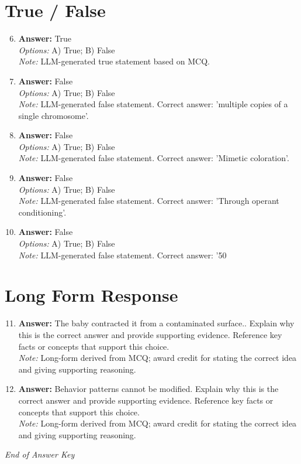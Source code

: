 \documentclass[12pt]{article}
\begin{document}
\section*{True / False}
\begin{enumerate}[label=\arabic*.]
\setcounter{enumi}{5}
\item \textbf{Answer:} True
\\ \textit{Options:} A) True; B) False
\\ \textit{Note:} LLM-generated true statement based on MCQ.
\item \textbf{Answer:} False
\\ \textit{Options:} A) True; B) False
\\ \textit{Note:} LLM-generated false statement. Correct answer: 'multiple copies of a single chromosome'.
\item \textbf{Answer:} False
\\ \textit{Options:} A) True; B) False
\\ \textit{Note:} LLM-generated false statement. Correct answer: 'Mimetic coloration'.
\item \textbf{Answer:} False
\\ \textit{Options:} A) True; B) False
\\ \textit{Note:} LLM-generated false statement. Correct answer: 'Through operant conditioning'.
\item \textbf{Answer:} False
\\ \textit{Options:} A) True; B) False
\\ \textit{Note:} LLM-generated false statement. Correct answer: '50%
\end{enumerate}

\section*{Long Form Response}
\begin{enumerate}[label=\arabic*.]
\setcounter{enumi}{10}
\item \textbf{Answer:} The baby contracted it from a contaminated surface.. Explain why this is the correct
answer and provide supporting evidence. Reference key facts or concepts that support this
choice.
\\ \textit{Note:} Long-form derived from MCQ; award credit for stating the correct idea and giving supporting reasoning.
\item \textbf{Answer:} Behavior patterns cannot be modified. Explain why this is the correct answer and provide
supporting evidence. Reference key facts or concepts that support this choice.
\\ \textit{Note:} Long-form derived from MCQ; award credit for stating the correct idea and giving supporting reasoning.
\end{enumerate}

\vfill
\noindent\textit{End of Answer Key}
\end{document}
